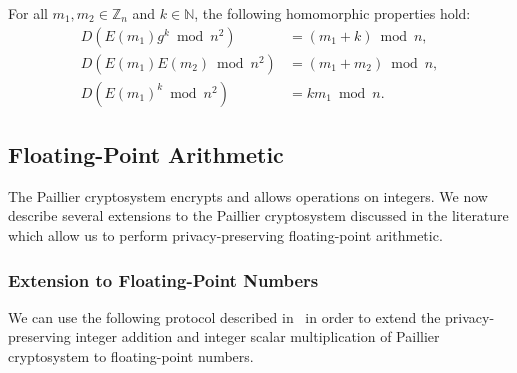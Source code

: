 For all $m_1,m_2 \in \mathbb{Z}_n$ and $k\in \mathbb{N}$, the following homomorphic properties hold:
\begin{align*}
	D\left(E\left(m_1\right) g^k\bmod n^2\right) &= \left(m_1+k\right)\bmod n,\\
	D\left(E\left(m_1\right) E\left(m_2\right)\bmod n^2\right) &= \left(m_1+m_2\right)\bmod n,\\
	D\left(E\left(m_1\right)^k\bmod n^2\right) &= km_1\bmod n.
\end{align*}

\subsection{Floating-Point Arithmetic}
\label{sec:fp_arithmetic}
The Paillier cryptosystem encrypts and allows operations on integers. We now describe several extensions to the Paillier cryptosystem discussed in the literature which allow us to perform privacy-preserving floating-point arithmetic.

\subsubsection{Extension to Floating-Point Numbers}
\label{sec:fp_operations}
We can use the following protocol described in~\cite{ziad_cryptoimg:_2016} in order to extend the privacy-preserving integer addition and integer scalar multiplication of Paillier cryptosystem to floating-point numbers.

